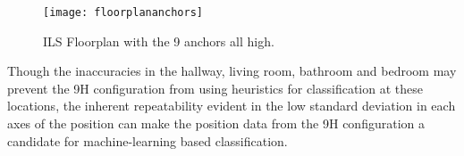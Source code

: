 \begin{figure}[ht]
    \centering
    \texttt{[image: floorplananchors]}
    \caption{ILS Floorplan with the 9 anchors all high.}
    \label{fig:anchorplacement}
\end{figure}

Though the inaccuracies in the hallway, living room, bathroom and bedroom may
prevent the 9H configuration from using heuristics for classification at these 
locations, the inherent repeatability evident in the low standard deviation in 
each axes of the position can make the position data from the 9H configuration
a candidate for machine-learning based classification. 
